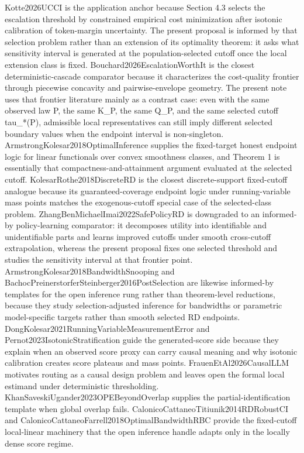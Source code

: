\documentclass{article}
\begin{document}
Kotte2026UCCI is the application anchor because Section 4.3 selects the escalation threshold by constrained empirical cost minimization after isotonic calibration of token-margin uncertainty. The present proposal is informed by that selection problem rather than an extension of its optimality theorem: it asks what sensitivity interval is generated at the population-selected cutoff once the local extension class is fixed. Bouchard2026EscalationWorthIt is the closest deterministic-cascade comparator because it characterizes the cost-quality frontier through piecewise concavity and pairwise-envelope geometry. The present note uses that frontier literature mainly as a contrast case: even with the same observed law P, the same K_P, the same Q_P, and the same selected cutoff tau_*(P), admissible local representatives can still imply different selected boundary values when the endpoint interval is non-singleton. ArmstrongKolesar2018OptimalInference supplies the fixed-target honest endpoint logic for linear functionals over convex smoothness classes, and Theorem 1 is essentially that compactness-and-attainment argument evaluated at the selected cutoff. KolesarRothe2018DiscreteRD is the closest discrete-support fixed-cutoff analogue because its guaranteed-coverage endpoint logic under running-variable mass points matches the exogenous-cutoff special case of the selected-class problem. ZhangBenMichaelImai2022SafePolicyRD is downgraded to an informed-by policy-learning comparator: it decomposes utility into identifiable and unidentifiable parts and learns improved cutoffs under smooth cross-cutoff extrapolation, whereas the present proposal fixes one selected threshold and studies the sensitivity interval at that frontier point. ArmstrongKolesar2018BandwidthSnooping and BachocPreinerstorferSteinberger2016PostSelection are likewise informed-by templates for the open inference rung rather than theorem-level reductions, because they study selection-adjusted inference for bandwidths or parametric model-specific targets rather than smooth selected RD endpoints. DongKolesar2021RunningVariableMeasurementError and Pernot2023IsotonicStratification guide the generated-score side because they explain when an observed score proxy can carry causal meaning and why isotonic calibration creates score plateaus and mass points. FrauenEtAl2026CausalLLM motivates routing as a causal design problem and leaves open the formal local estimand under deterministic thresholding. KhanSaveskiUgander2023OPEBeyondOverlap supplies the partial-identification template when global overlap fails. CalonicoCattaneoTitiunik2014RDRobustCI and CalonicoCattaneoFarrell2018OptimalBandwidthRBC provide the fixed-cutoff local-linear machinery that the open inference handle adapts only in the locally dense score regime.
\end{document}
